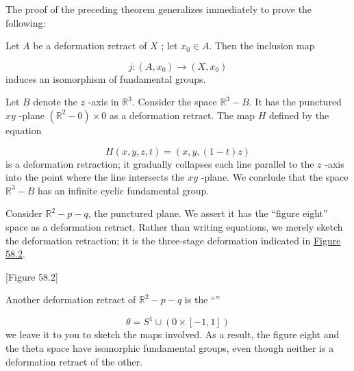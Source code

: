 The proof of the preceding theorem generalizes immediately to prove the following:

\begin{theorem}
\label{thm:\thetheorem}
Let \(A\) be a deformation retract of \(X\) ; let \(x_{0} \in A\). Then the inclusion map

\[
j : ( {A,x_{0}}) \rightarrow ( {X,x_{0}})
\]
induces an isomorphism of fundamental groups.
\end{theorem}

\begin{centeredblock}
\begin{example}
\label{ex:\thesection.\theexample}
Let \(B\) denote the \(z\) -axis in \(\mathbb{R}^{3}\). Consider the space \(\mathbb{R}^{3} - B\). It has the punctured \({xy}\) -plane \(( {\mathbb{R}^{2} - 0}) \times 0\) as a deformation retract. The map \(H\) defined by the equation

\[
H( {x,y,z,t}) = ( {x,y,( {1 - t}) z})
\]
is a deformation retraction; it gradually collapses each line parallel to the \(z\) -axis into the point where the line intersects the \({xy}\) -plane. We conclude that the space \(\mathbb{R}^{3} - B\) has an infinite cyclic fundamental group.

\end{example}
\end{centeredblock}

\begin{centeredblock}
\begin{example}
\label{ex:\thesection.\theexample}
Consider \(\mathbb{R}^{2} - p - q\), the punctured plane. We assert it has the ``figure eight'' space as a deformation retract. Rather than writing equations, we merely sketch the deformation retraction; it is the three-stage deformation indicated in \hyperref[fig:58.2]{Figure 58.2}.

[Figure 58.2]
\end{example}
\end{centeredblock}

\begin{centeredblock}
\begin{example}
\label{ex:\thesection.\theexample}
Another deformation retract of \(\mathbb{R}^{2} - p - q\) is the ``''

\[
\theta = S^{1} \cup ( {0 \times [ {-1,1}] })
\]
we leave it to you to sketch the maps involved. As a result, the figure eight and the theta space have isomorphic fundamental groups, even though neither is a deformation retract of the other.
\end{example}
\end{centeredblock}


